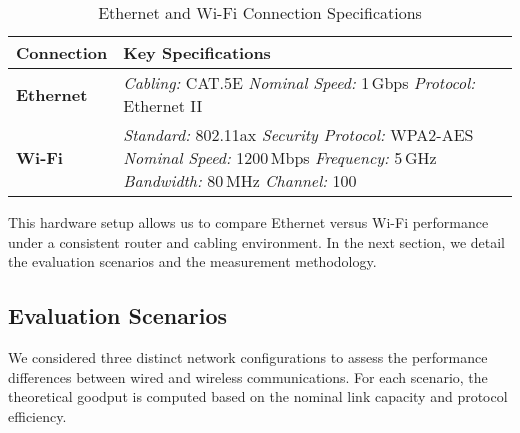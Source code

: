         \begin{table}[ht]
            \small
            \centering
            \begin{tabular}{@{}l p{}@{}}
            \toprule
            \textbf{Connection} & \textbf{Key Specifications} \\
            \midrule
            \textbf{Ethernet} 
                & \textit{Cabling:}     CAT.5E \newline
                \textit{Nominal Speed:} 1\,Gbps    \hspace{2em}    \textit{Protocol:} Ethernet II \\ %
            \midrule
            \textbf{Wi-Fi} 
                & \textit{Standard:}    802.11ax   \hspace{3.6em}  \textit{Security Protocol:} WPA2-AES \newline %
                \textit{Nominal Speed:} 1200\,Mbps \hspace{0.5em}  \textit{Frequency:} 5\,GHz \newline %
                \textit{Bandwidth:}     80\,MHz    \hspace{3.25em} \textit{Channel:} 100 \\ %
            \bottomrule
            \end{tabular}
            \vspace{0.5cm}
            \caption{Ethernet and Wi-Fi Connection Specifications}
            \label{tab:connection-specs}
        \end{table}

        \vspace{-0.3cm} %

        \noindent This hardware setup allows us to compare Ethernet versus Wi-Fi performance under a consistent router and cabling environment. 
        In the next section, we detail the evaluation scenarios and the measurement methodology.

    \subsection{Evaluation Scenarios} \label{subsec:evaluation-scenarios}

        We considered three distinct network configurations to assess the performance differences between wired and wireless communications. 
        For each scenario, the theoretical goodput is computed based on the nominal link capacity and protocol efficiency.

